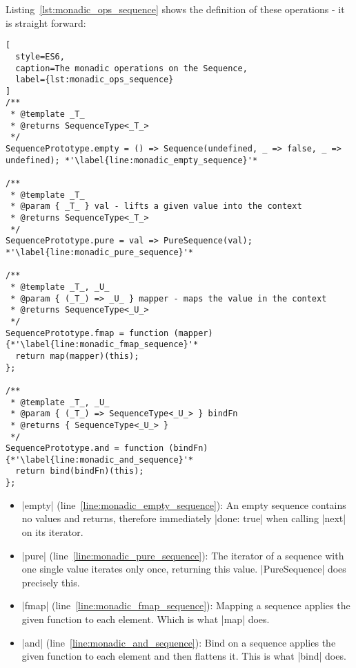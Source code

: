 Listing~\ref{lst:monadic_ops_sequence} shows the definition of these
operations - it is straight forward:
\begin{lstlisting}[
  style=ES6,
  caption=The monadic operations on the Sequence,
  label={lst:monadic_ops_sequence}
]
/**
 * @template _T_
 * @returns SequenceType<_T_>
 */
SequencePrototype.empty = () => Sequence(undefined, _ => false, _ => undefined); *'\label{line:monadic_empty_sequence}'*

/**
 * @template _T_
 * @param { _T_ } val - lifts a given value into the context
 * @returns SequenceType<_T_>
 */
SequencePrototype.pure = val => PureSequence(val); *'\label{line:monadic_pure_sequence}'*

/**
 * @template _T_, _U_
 * @param { (_T_) => _U_ } mapper - maps the value in the context
 * @returns SequenceType<_U_>
 */
SequencePrototype.fmap = function (mapper) {*'\label{line:monadic_fmap_sequence}'*
  return map(mapper)(this); 
};

/**
 * @template _T_, _U_
 * @param { (_T_) => SequenceType<_U_> } bindFn
 * @returns { SequenceType<_U_> }
 */
SequencePrototype.and = function (bindFn) {*'\label{line:monadic_and_sequence}'*
  return bind(bindFn)(this); 
};
\end{lstlisting}

\begin{itemize}
  \item |empty| (line~\ref{line:monadic_empty_sequence}): An empty sequence
    contains no values and returns, therefore immediately |done: true| when
    calling |next| on its iterator.
  \item |pure| (line~\ref{line:monadic_pure_sequence}): The iterator of a
    sequence with one single value iterates only once, returning this value.
    |PureSequence| does precisely this.
  \item |fmap| (line~\ref{line:monadic_fmap_sequence}): Mapping a sequence
    applies the given function to each element. Which is what |map| does.
  \item |and| (line~\ref{line:monadic_and_sequence}): Bind on a sequence
    applies the given function to each element and then flattens it. This is
    what |bind| does.
\end{itemize}
